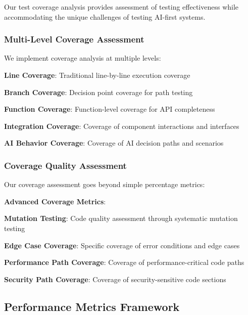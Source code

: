 Our test coverage analysis provides assessment of testing effectiveness while accommodating the unique challenges of testing AI-first systems.

\subsubsection*{Multi-Level Coverage Assessment}

We implement coverage analysis at multiple levels:

\begin{compactlist}
    \item \textbf{Line Coverage}: Traditional line-by-line execution coverage
    \item \textbf{Branch Coverage}: Decision point coverage for path testing
    \item \textbf{Function Coverage}: Function-level coverage for API completeness
    \item \textbf{Integration Coverage}: Coverage of component interactions and interfaces
    \item \textbf{AI Behavior Coverage}: Coverage of AI decision paths and scenarios
\end{compactlist}

\subsubsection*{Coverage Quality Assessment}

Our coverage assessment goes beyond simple percentage metrics:

\begin{successbox}
\textbf{Advanced Coverage Metrics}:
\begin{compactlist}
    \item \textbf{Mutation Testing}: Code quality assessment through systematic mutation testing
    \item \textbf{Edge Case Coverage}: Specific coverage of error conditions and edge cases
    \item \textbf{Performance Path Coverage}: Coverage of performance-critical code paths
    \item \textbf{Security Path Coverage}: Coverage of security-sensitive code sections
\end{compactlist}
\end{successbox}

\subsection*{Performance Metrics Framework}


